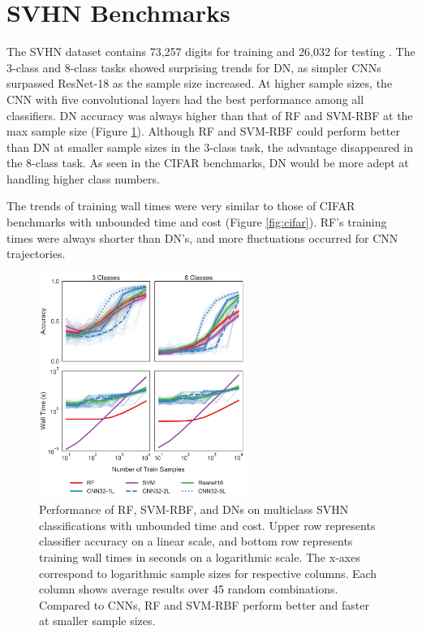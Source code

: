 \section{SVHN Benchmarks}
\label{svhn}
The SVHN dataset contains 73,257 digits for training and 26,032 for testing \citep{svhn}. The 3-class and 8-class tasks showed surprising trends for DN, as simpler CNNs surpassed ResNet-18 as the sample size increased. At higher sample sizes, the CNN with five convolutional layers had the best performance among all classifiers. DN accuracy was always higher than that of RF and SVM-RBF at the max sample size (Figure \ref{fig:svhn}). Although RF and SVM-RBF could perform better than DN at smaller sample sizes in the 3-class task, the advantage disappeared in the 8-class task. As seen in the CIFAR benchmarks, DN would be more adept at handling higher class numbers.

The trends of training wall times were very similar to those of CIFAR benchmarks with unbounded time and cost (Figure \ref{fig:cifar}). RF's training times were always shorter than DN's, and more fluctuations occurred for CNN trajectories.

\begin{figure}[!htb]
\centering
\includegraphics[width=0.6\textwidth]{figures/svhn.pdf}
  \caption{Performance of RF, SVM-RBF, and DNs on multiclass SVHN classifications with unbounded time and cost.
  Upper row represents classifier accuracy on a linear scale, and bottom row represents training wall times in seconds on a logarithmic scale. The x-axes correspond to logarithmic sample sizes for respective columns. Each column shows average results over 45 random combinations.
  Compared to CNNs, RF and SVM-RBF perform better and faster at smaller sample sizes.
  }
\label{fig:svhn}
\end{figure}
\vfil\eject

